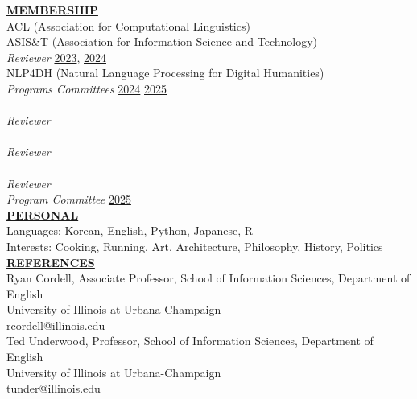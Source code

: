 \documentclass{article}
\begin{document}
\noindent \textbf{\underline{MEMBERSHIP}} \\ 
\noindent ACL (Association for Computational Linguistics) \\
\noindent ASIS\&T (Association for Information Science and Technology) \\
\textit{Reviewer} \hfill \href{https://www.asist.org/meetings-events/am/am23/2023-annual-meeting-reviewers/}{2023}, \href{https://www.asist.org/meetings-events/am/am24/2024-annual-meeting-reviewers/}{2024}\\
\noindent NLP4DH (Natural Language Processing for Digital Humanities) \\
\textit{Programs Committees} \hfill \href{https://www.nlp4dh.com/nlp4dh-2024}{2024} \href{https://www.nlp4dh.com/nlp4dh-2025}{2025} \\
 \\
\textit{Reviewer} \\
 \\
\textit{Reviewer} \\
 \\
\textit{Reviewer} \\
\textit{Program Committee} \hfill \href{https://a-liep.org/}{2025} \\

\noindent \textbf{\underline{PERSONAL}} \\
\noindent Languages: Korean, English, Python, Japanese, R \\
\noindent Interests: Cooking, Running, Art, Architecture, Philosophy, History, Politics \\

\noindent \textbf{\underline{REFERENCES}} \\
\noindent Ryan Cordell, Associate Professor, School of Information Sciences, Department of English \\ 
University of Illinois at Urbana-Champaign \\
rcordell@illinois.edu \\

\noindent Ted Underwood, Professor, School of Information Sciences, Department of English \\
University of Illinois at Urbana-Champaign \\
tunder@illinois.edu \\
\end{document}
